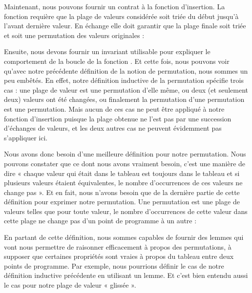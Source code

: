 


Maintenant, nous pouvons fournir un contrat à la fonction d'insertion. La
fonction requière que la plage de valeurs considérée soit triée du début jusqu'à
l'avant dernière valeur. En échange elle doit garantir que la plage finale soit
triée et soit une permutation des valeurs originales :






Ensuite, nous devons fournir un invariant utilisable pour expliquer le comportement
de la boucle de la fonction . Et cette fois, nous pouvons voir
qu'avec notre précédente définition de la notion de permutation, nous sommes un
peu embêtés. En effet, notre définition inductive de la permutation spécifie trois
cas : une plage de valeur est une permutation d'elle même, ou deux (et seulement
deux) valeurs ont été changées, ou finalement la permutation d'une permutation est
une permutation. Mais aucun de ces cas ne peut être appliqué à notre fonction
d'insertion puisque la plage obtenue ne l'est pas par une succession d'échanges de
valeurs, et les deux autres cas ne peuvent évidemment pas s'appliquer ici.



Nous avons donc besoin d'une meilleure définition pour notre permutation. Nous
pouvons constater que ce dont nous avons vraiment besoin, c'est une manière de
dire « chaque valeur qui était dans le tableau est toujours dans le tableau et
si plusieurs valeurs étaient équivalentes, le nombre d'occurrences de ces valeurs
ne change pas ». Et en fait, nous n'avons besoin que de la dernière partie de cette
définition pour exprimer notre permutation. Une permutation est une plage de valeurs
telles que pour toute valeur, le nombre d'occurrences de cette valeur dans cette
plage ne change pas d'un point de programme à un autre :






En partant de cette définition, nous sommes capables de fournir des lemmes qui
vont nous permettre de raisonner efficacement à propos des permutations, à
supposer que certaines propriétés sont vraies à propos du tableau entre deux
points de programme. Par exemple, nous pourrions définir le cas 
de notre définition inductive précédente en utilisant un lemme. Et c'est bien
entendu aussi le cas pour notre plage de valeur « glissée ».



